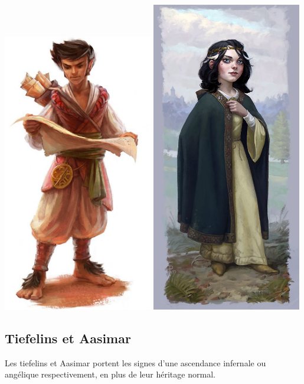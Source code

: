 \documentclass[10pt,a4paper]{book}
\begin{document}
\includegraphics[width=0.49\textwidth]{halfelin 1}
\includegraphics[width=0.49\textwidth]{halfelin 2}
\subsection{Tiefelins et Aasimar}
Les tiefelins et Aasimar portent les signes d'une ascendance infernale ou angélique respectivement, en plus de leur héritage normal. 
\end{document}
